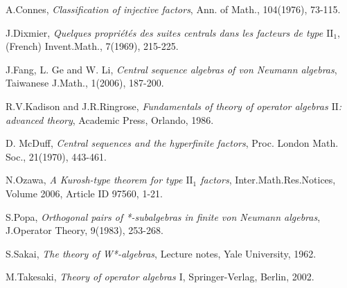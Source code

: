 \documentclass[12pt]{article}
\begin{document}
\begin{thebibliography}{1}


\bibitem{[Co]} A.Connes, {\em{Classification of injective factors}},
Ann. of Math., 104(1976), 73-115.


\bibitem{[Dix]} J.Dixmier, {\em{Quelques propri\'{e}t\'{e}s des suites centrals dans les facteurs de type $\mathrm{II}_{1}$}},
(French) Invent.Math., 7(1969), 215-225.

\bibitem{[FGL]} J.Fang, L. Ge and W. Li, {\em{Central sequence algebras of von Neumann
algebras}}, Taiwanese J.Math., 1(2006), 187-200.


\bibitem{[KR]} R.V.Kadison and J.R.Ringrose, {\em{Fundamentals of theory of operator
algebras $\mathrm{II}$: advanced theory}}, Academic Press, Orlando,
1986.

\bibitem{[MD]} D. McDuff, {\em{Central sequences and the hyperfinite
factors}}, Proc. London Math. Soc., 21(1970), 443-461.

\bibitem{[Oz]} N.Ozawa, {\em{A Kurosh-type theorem for type $\mathrm{II}_{1}$
factors}}, Inter.Math.Res.Notices, Volume 2006, Article ID 97560,
1-21.

\bibitem{[Po]} S.Popa, {\em{Orthogonal pairs of *-subalgebras in finite von Neumann
algebras}}, J.Operator Theory, 9(1983), 253-268.

\bibitem{[Sa]} S.Sakai, {\em{The theory of W*-algebras}}, Lecture
notes, Yale University, 1962.

\bibitem{[Ta]} M.Takesaki, {\em{Theory of operator algebras
$\mathrm{I}$}}, Springer-Verlag, Berlin, 2002.












\end{thebibliography}
\end{document}
